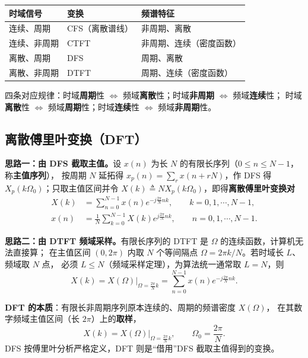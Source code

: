 \begin{center}
\begin{tabular}{lll}
\toprule
时域信号 & 变换 & 频谱特征 \\
\midrule
连续、周期 & CFS（离散谱线） & 非周期、离散 \\
连续、非周期 & CTFT & 非周期、连续（密度函数） \\
离散、周期 & DFS & 周期、离散 \\
离散、非周期 & DTFT & 周期、连续（密度函数） \\
\bottomrule
\end{tabular}
\end{center}
四条对应规律：时域\textbf{周期}性 $\Leftrightarrow$ 频域\textbf{离散}性；时域\textbf{非周期} $\Leftrightarrow$ 频域\textbf{连续}性；
时域\textbf{离散}性 $\Leftrightarrow$ 频域\textbf{周期}性；时域\textbf{连续}性 $\Leftrightarrow$ 频域\textbf{非周期}性。

\subsection{离散傅里叶变换（DFT）}

\textbf{思路一：由 DFS 截取主值。}设 $x(n)$ 为长 $N$ 的有限长序列（$0\le n\le N-1$，称\textbf{主值序列}），
按周期 $N$ 延拓得 $x_p(n)=\sum_r x(n+rN)$，作 DFS 得 $X_p(k\Omega_0)$；只取主值区间并令
$X(k)\triangleq N X_p(k\Omega_0)$，即得\textbf{离散傅里叶变换对}
\begin{align}
X(k)&=\sum_{n=0}^{N-1}x(n)e^{-j\frac{2\pi}{N}nk},
\qquad k=0,1,\cdots,N-1,\\
x(n)&=\frac{1}{N}\sum_{k=0}^{N-1}X(k)e^{j\frac{2\pi}{N}nk},
\qquad n=0,1,\cdots,N-1.
\end{align}

\textbf{思路二：由 DTFT 频域采样。}有限长序列的 DTFT 是 $\Omega$ 的连续函数，计算机无法直接算；
在主值区间 $(0,2\pi)$ 内取 $N$ 个等间隔点 $\Omega=2\pi k/N$。若时域长 $L$、频域取 $N$ 点，
必须 $L\le N$（频域采样定理），为算法统一通常取 $L=N$，则
\begin{equation}
X(k)=X(\Omega)\Big|_{\Omega=\frac{2\pi}{N}k}
=\sum_{n=0}^{N-1}x(n)e^{-j\frac{2\pi}{N}nk}.
\end{equation}

\textbf{DFT 的本质}：有限长非周期序列原本连续的、周期的频谱密度 $X(\Omega)$，
在其数字频域主值区间（长 $2\pi$）上的\textbf{取样}，
\begin{equation}
X(k)=X(\Omega)\Big|_{\Omega=\frac{2\pi}{N}k},\qquad \Omega_0=\frac{2\pi}{N}.
\end{equation}
DFS 按傅里叶分析严格定义，DFT 则是“借用”DFS 截取主值得到的变换。

